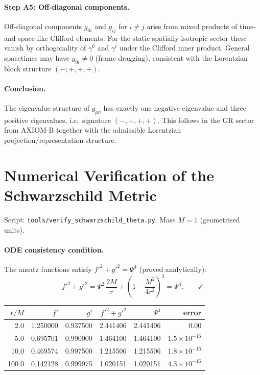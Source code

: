 \documentclass[12pt,a4paper]{article}
\theoremstyle{definition}
\theoremstyle{remark}
\begin{document}
\paragraph{Step A5: Off-diagonal components.}
Off-diagonal components $g_{0i}$ and $g_{ij}$ for $i \neq j$ arise from
mixed products of time- and space-like Clifford elements.
For the static spatially isotropic sector these vanish by orthogonality
of $\gamma^0$ and $\gamma^i$ under the Clifford inner product.
General spacetimes may have $g_{0i} \neq 0$ (frame dragging), consistent
with the Lorentzian block structure $(-;+,+,+)$.

\paragraph{Conclusion.}
The eigenvalue structure of $g_{\mu\nu}$ has exactly one negative eigenvalue
and three positive eigenvalues, i.e.\ signature $(-,+,+,+)$.
This follows in the GR sector from AXIOM-B together with the admissible
Lorentzian projection/representation structure.

\section{Numerical Verification of the Schwarzschild Metric}
\label{app:numerics}

Script: \texttt{tools/verify\_schwarzschild\_theta.py}.
Mass $M = 1$ (geometrised units).

\paragraph{ODE consistency condition.}
The ansatz functions satisfy $f'^2 + g'^2 = \Psi^4$ (proved analytically):
\[
  f'^2 + g'^2
  = \Psi^2\,\frac{2M}{r} + \left(1 - \frac{M^2}{4r^2}\right)^2
  = \Psi^4. \qquad \checkmark
\]

\begin{center}
\begin{tabular}{rrrrrr}
\toprule
$r/M$ & $f'$ & $g'$ & $f'^2+g'^2$ & $\Psi^4$ & error \\
\midrule
2.0   & 1.250000 & 0.937500 & 2.441406 & 2.441406 & $0.00$               \\
5.0   & 0.695701 & 0.990000 & 1.464100 & 1.464100 & $1.5\times10^{-16}$  \\
10.0  & 0.469574 & 0.997500 & 1.215506 & 1.215506 & $1.8\times10^{-16}$  \\
100.0 & 0.142128 & 0.999975 & 1.020151 & 1.020151 & $4.3\times10^{-16}$  \\
\bottomrule
\end{tabular}
\end{center}
\end{document}
